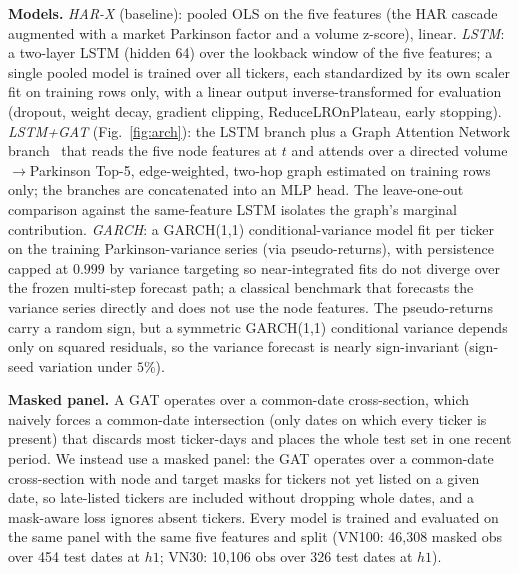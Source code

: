 \documentclass[runningheads]{llncs}
\begin{document}
\textbf{Models.} \emph{HAR-X} (baseline): pooled OLS on the five features (the HAR cascade augmented with a market Parkinson factor and a volume z-score), linear. \emph{LSTM}: a two-layer LSTM
(hidden 64) over the lookback window of the five features; a single pooled model is trained over all tickers,
each standardized by its own scaler fit on training rows only, with a linear output inverse-transformed for
evaluation (dropout, weight decay, gradient clipping, ReduceLROnPlateau, early stopping). \emph{LSTM+GAT}
(Fig.~\ref{fig:arch}): the LSTM branch plus a Graph Attention Network branch~\cite{gat2018} that reads the five
node features at $t$ and attends over a directed volume$\to$Parkinson Top-5, edge-weighted, two-hop graph
estimated on training rows only; the branches are concatenated into an MLP head. The leave-one-out comparison
against the same-feature LSTM isolates the graph's marginal contribution. \emph{GARCH}: a GARCH(1,1)
conditional-variance model fit per ticker on the training Parkinson-variance series (via pseudo-returns), with
persistence capped at $0.999$ by variance targeting so near-integrated fits do not diverge over the frozen
multi-step forecast path; a classical benchmark that forecasts the variance series directly and does not use
the node features. The pseudo-returns carry a random sign, but a symmetric GARCH(1,1) conditional variance
depends only on squared residuals, so the variance forecast is nearly sign-invariant (sign-seed variation
under $5\%$).

\textbf{Masked panel.} A GAT operates over a common-date cross-section, which naively forces a
common-date intersection (only dates on which every ticker is present) that discards most ticker-days and
places the whole test set in one recent period. We instead use a masked panel: the GAT operates
over a common-date cross-section with node and target masks for tickers not yet listed on a given date, so
late-listed tickers are included without dropping whole dates, and a mask-aware loss ignores absent tickers.
Every model is trained and evaluated on the same panel with the same five features and split (VN100: 46{,}308
masked obs over 454 test dates at $h1$; VN30: 10{,}106 obs over 326 test dates at $h1$).
\end{document}

